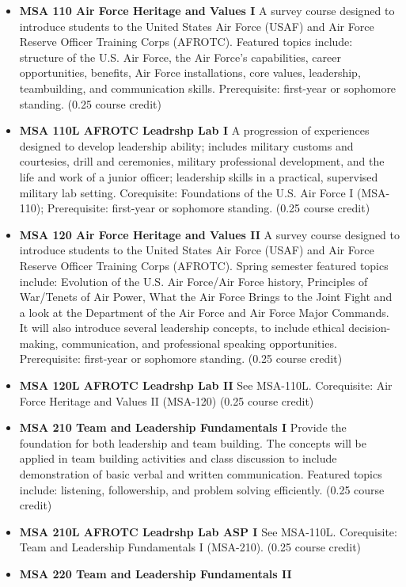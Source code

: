 \documentclass[
  letterpaper,
]{scrbook}
\providecommand{\tightlist}{%
  \setlength{\itemsep}{0pt}\setlength{\parskip}{0pt}}
\begin{document}
\begin{itemize}
\tightlist
\item
  \textbf{MSA 110 Air Force Heritage and Values I} A survey course
  designed to introduce students to the United States Air Force (USAF)
  and Air Force Reserve Officer Training Corps (AFROTC). Featured topics
  include: structure of the U.S. Air Force, the Air Force's
  capabilities, career opportunities, benefits, Air Force installations,
  core values, leadership, teambuilding, and communication skills.
  Prerequisite: first-year or sophomore standing. (0.25 course credit)\\
\item
  \textbf{MSA 110L AFROTC Leadrshp Lab I} A progression of experiences
  designed to develop leadership ability; includes military customs and
  courtesies, drill and ceremonies, military professional development,
  and the life and work of a junior officer; leadership skills in a
  practical, supervised military lab setting. Corequisite: Foundations
  of the U.S. Air Force I (MSA-110); Prerequisite: first-year or
  sophomore standing. (0.25 course credit)
\item
  \textbf{MSA 120 Air Force Heritage and Values II} A survey course
  designed to introduce students to the United States Air Force (USAF)
  and Air Force Reserve Officer Training Corps (AFROTC). Spring semester
  featured topics include: Evolution of the U.S. Air Force/Air Force
  history, Principles of War/Tenets of Air Power, What the Air Force
  Brings to the Joint Fight and a look at the Department of the Air
  Force and Air Force Major Commands. It will also introduce several
  leadership concepts, to include ethical decision-making,
  communication, and professional speaking opportunities. Prerequisite:
  first-year or sophomore standing. (0.25 course credit)
\item
  \textbf{MSA 120L AFROTC Leadrshp Lab II} See MSA-110L. Corequisite:
  Air Force Heritage and Values II (MSA-120) (0.25 course credit)
\item
  \textbf{MSA 210 Team and Leadership Fundamentals I} Provide the
  foundation for both leadership and team building. The concepts will be
  applied in team building activities and class discussion to include
  demonstration of basic verbal and written communication. Featured
  topics include: listening, followership, and problem solving
  efficiently. (0.25 course credit)
\item
  \textbf{MSA 210L AFROTC Leadrshp Lab ASP I} See MSA-110L. Corequisite:
  Team and Leadership Fundamentals I (MSA-210). (0.25 course credit)
\item
  \textbf{MSA 220 Team and Leadership Fundamentals II}
\end{itemize}

\backmatter
\printindex
\end{document}

